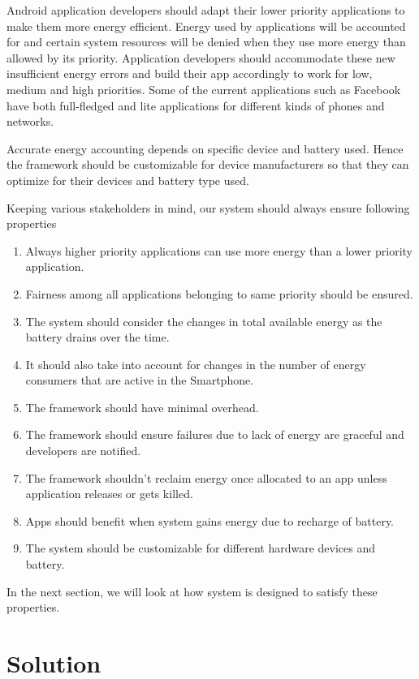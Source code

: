 Android application developers should adapt their lower priority applications to make them more energy efficient. Energy used by applications will be accounted for and certain system resources will be denied when they use more energy than allowed by its priority. Application developers should accommodate these new insufficient energy errors and build their app accordingly to work for low, medium and high priorities. Some of the current applications such as Facebook have both full-fledged and lite applications for different kinds of phones and networks.

Accurate energy accounting depends on specific device and battery used. Hence the framework should be customizable for device manufacturers so that they can optimize for their devices and battery type used. 


Keeping various stakeholders in mind, our system should always ensure following properties

\begin{enumerate}
\item Always higher priority applications can use more energy than a lower priority application.
\item Fairness among all applications belonging to same priority should be ensured.
\item The system should consider the changes in total available energy as the battery drains over the time.
\item It should also take into account for changes in the number of energy consumers that are active in the Smartphone. 
\item The framework should have minimal overhead.
\item The framework should ensure failures due to lack of energy are graceful and developers are notified.
\item The framework shouldn't reclaim energy once allocated to an app unless application releases or gets killed. 
\item Apps should benefit when system gains energy due to recharge of battery.
\item The system should be customizable for different hardware devices and battery.

\end{enumerate}


In the next section, we will look at how system is designed to satisfy these properties.


\section{Solution}



